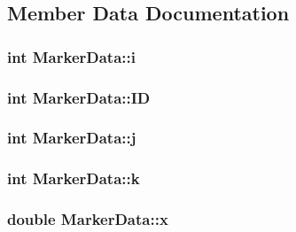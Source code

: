 \subsection{Member Data Documentation}
\subsubsection[{\texorpdfstring{i}{i}}]{\setlength{\rightskip}{0pt plus 5cm}int Marker\+Data\+::i}\hypertarget{class_marker_data_abb9f15d2132f7007cf0612d53cd969db}{}\label{class_marker_data_abb9f15d2132f7007cf0612d53cd969db}
\subsubsection[{\texorpdfstring{ID}{ID}}]{\setlength{\rightskip}{0pt plus 5cm}int Marker\+Data\+::\+ID}\hypertarget{class_marker_data_aae16e1f3245f8ef95ed6170e3775669d}{}\label{class_marker_data_aae16e1f3245f8ef95ed6170e3775669d}
\subsubsection[{\texorpdfstring{j}{j}}]{\setlength{\rightskip}{0pt plus 5cm}int Marker\+Data\+::j}\hypertarget{class_marker_data_ae48473a1571656cf8f02403cb42a4adc}{}\label{class_marker_data_ae48473a1571656cf8f02403cb42a4adc}
\subsubsection[{\texorpdfstring{k}{k}}]{\setlength{\rightskip}{0pt plus 5cm}int Marker\+Data\+::k}\hypertarget{class_marker_data_a66183b4e9a166279551f4c180d0d71c8}{}\label{class_marker_data_a66183b4e9a166279551f4c180d0d71c8}
\subsubsection[{\texorpdfstring{x}{x}}]{\setlength{\rightskip}{0pt plus 5cm}double Marker\+Data\+::x}\hypertarget{class_marker_data_aade1e2f618efa75989831f028db027cd}{}\label{class_marker_data_aade1e2f618efa75989831f028db027cd}
